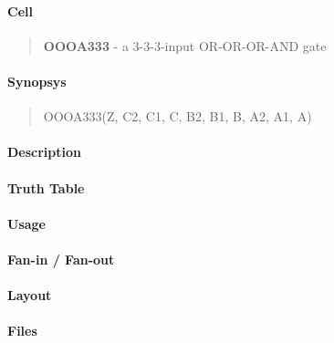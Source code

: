 \label{OOOA333}
\paragraph{Cell}
\begin{quote}
    \textbf{OOOA333} - a 3-3-3-input OR-OR-OR-AND gate
\end{quote}

\paragraph{Synopsys}
\begin{quote}
    OOOA333(Z, C2, C1, C, B2, B1, B, A2, A1, A)
\end{quote}

\paragraph{Description}

%

\paragraph{Truth Table}
%

\paragraph{Usage}

\paragraph{Fan-in / Fan-out}

\paragraph{Layout}

\paragraph{Files}
